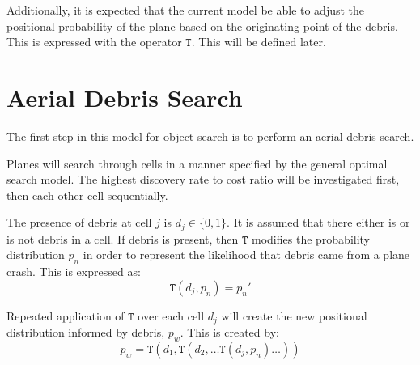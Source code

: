\documentclass[a4paper]{article}
\begin{document}
Additionally, it is expected that the current model be able to adjust the positional probability of the plane based on the originating point of the debris. This is expressed with the operator $\mathtt{T}$. This will be defined later. 

\section{Aerial Debris Search}

The first step in this model for object search is to perform an aerial debris search. 

Planes will search through cells in a manner specified by the general optimal search model. The highest discovery rate to cost ratio will be investigated first, then each other cell sequentially.

The presence of debris at cell $j$ is $d_j\in \{0,1\}$. It is assumed that there either is or is not debris in a cell. If debris is present, then $\mathtt{T}$ modifies the probability distribution $p_n$ in order to represent the likelihood that debris came from a plane crash. This is expressed as: $$\mathtt{T}(d_j,p_n)=p_n'$$

Repeated application of $\mathtt{T}$ over each cell $d_j$ will create the new positional distribution informed by debris, $p_w$. This is created by: $$p_w=\mathtt{T}(d_1, \mathtt{T}(d_2, \ldots \mathtt{T}(d_j, p_n)\ldots))$$
\end{document}
